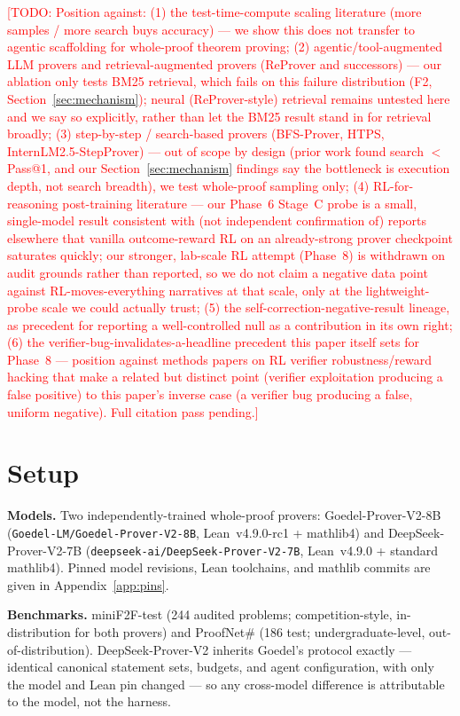 \documentclass{article}
\newcommand{\todo}[1]{\textcolor{red}{[TODO: #1]}}
\begin{document}
\todo{Position against: (1) the test-time-compute scaling literature (more samples / more search buys
accuracy) --- we show this does not transfer to agentic scaffolding for whole-proof theorem proving;
(2) agentic/tool-augmented LLM provers and retrieval-augmented provers (ReProver and successors) ---
our ablation only tests BM25 retrieval, which fails on this failure distribution (F2,
Section~\ref{sec:mechanism}); neural (ReProver-style) retrieval remains untested here and we say so
explicitly, rather than let the BM25 result stand in for retrieval broadly; (3) step-by-step /
search-based provers (BFS-Prover, HTPS,
InternLM2.5-StepProver) --- out of scope by design (prior work found search $<$ Pass@1, and our
Section~\ref{sec:mechanism} findings say the bottleneck is execution depth, not search breadth), we test whole-proof
sampling only; (4) RL-for-reasoning post-training literature --- our Phase~6 Stage~C probe is a small, single-model
result consistent with (not independent confirmation of) reports elsewhere that vanilla outcome-reward
RL on an already-strong prover checkpoint saturates quickly; our stronger, lab-scale RL attempt
(Phase~8) is withdrawn on audit grounds rather than reported, so we do not claim a negative data point
against RL-moves-everything narratives at that scale, only at the lightweight-probe scale we could
actually trust; (5) the self-correction-negative-result lineage, as precedent for reporting a
well-controlled null as a contribution in its own right; (6) the verifier-bug-invalidates-a-headline
precedent this paper itself sets for Phase~8 --- position against methods papers on RL verifier
robustness/reward hacking that make a related but distinct point (verifier exploitation producing a
false positive) to this paper's inverse case (a verifier bug producing a false, uniform negative).
Full citation pass pending.}

\section{Setup}
\label{sec:setup}

\textbf{Models.} Two independently-trained whole-proof provers: Goedel-Prover-V2-8B
(\texttt{Goedel-LM/Goedel-Prover-V2-8B}, Lean~v4.9.0-rc1 + mathlib4) and DeepSeek-Prover-V2-7B
(\texttt{deepseek-ai/DeepSeek-Prover-V2-7B}, Lean~v4.9.0 + standard mathlib4). Pinned model
revisions, Lean toolchains, and mathlib commits are given in Appendix~\ref{app:pins}.

\textbf{Benchmarks.} miniF2F-test (244 audited problems; competition-style, in-distribution for both
provers) and ProofNet\# (186 test; undergraduate-level, out-of-distribution). DeepSeek-Prover-V2
inherits Goedel's protocol exactly --- identical canonical statement sets, budgets, and agent
configuration, with only the model and Lean pin changed --- so any cross-model difference is
attributable to the model, not the harness.
\end{document}
